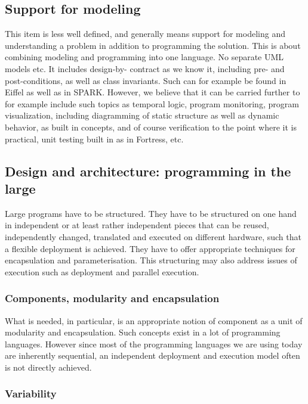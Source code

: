 \subsection{Support for modeling}

This item is less well defined, and generally means support for 
modeling and understanding a problem in addition to programming the 
solution. This is about combining modeling and programming into one 
language.  No separate UML models etc.  It includes design-by-
contract as we know it, including pre- and post-conditions, as well 
as class invariants. Such can for example be found in Eiffel as 
well as in SPARK. However, we believe that it can be carried 
further to for example include such topics as temporal logic, 
program monitoring, program visualization, including diagramming of 
static structure as well as dynamic behavior, as built in concepts, 
and of course verification to the point where it is practical, unit 
testing built in as in Fortress, etc.

\subsection{Design and architecture: programming in the large}

Large programs have to be structured. They have to be structured on 
one hand in independent or at least rather independent pieces that 
can be reused, independently changed, translated and executed on 
different hardware, such that a flexible deployment is achieved. 
They have to offer appropriate techniques for encapsulation and 
parameterisation. This structuring may also address issues of 
execution such as deployment and parallel execution.

\subsubsection{Components, modularity and encapsulation}

What is needed, in particular, is an appropriate notion of 
component as a unit of modularity and encapsulation. Such concepts 
exist in a lot of programming languages. However since most of the 
programming languages we are using today are inherently sequential, 
an independent deployment and execution model often is not directly 
achieved.

\subsubsection{Variability}

